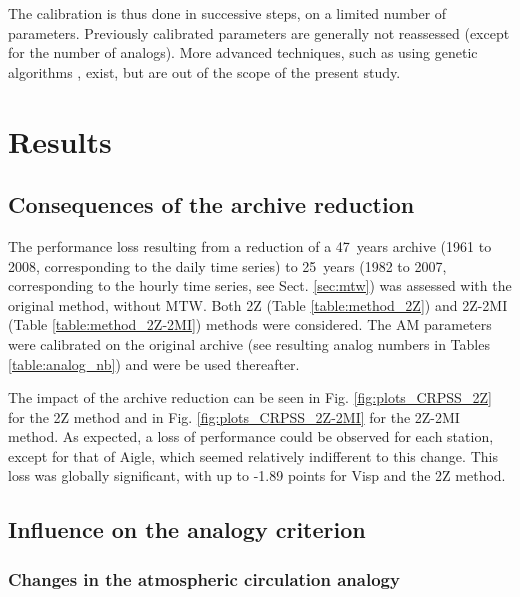 \documentclass[hess, manuscript]{copernicus}
\begin{document}
The calibration is thus done in successive steps, on a limited number of parameters. Previously calibrated parameters are generally not reassessed (except for the number of analogs). More advanced techniques, such as using genetic algorithms \citep{Horton2016}, exist, but are out of the scope of the present study.


\section{Results}
\label{sec:results}

\subsection{Consequences of the archive reduction}
\label{sec:archive_reduction}

The performance loss resulting from a reduction of a 47~years archive (1961 to 2008, corresponding to the daily time series) to 25~years (1982 to 2007, corresponding to the hourly time series, see Sect. \ref{sec:mtw}) was assessed with the original method, without MTW. Both 2Z (Table \ref{table:method_2Z}) and 2Z-2MI (Table \ref{table:method_2Z-2MI}) methods were considered. The AM parameters were calibrated on the original archive (see resulting analog numbers in Tables \ref{table:analog_nb}) and were be used thereafter.

The impact of the archive reduction can be seen in Fig. \ref{fig:plots_CRPSS_2Z} for the 2Z method and in Fig. \ref{fig:plots_CRPSS_2Z-2MI} for the 2Z-2MI method. As expected, a loss of performance could be observed for each station, except for that of Aigle, which seemed relatively indifferent to this change. This loss was globally significant, with up to -1.89 points for Visp and the 2Z method. 


\subsection{Influence on the analogy criterion}
\label{sec:influence_criteria}

\subsubsection{Changes in the atmospheric circulation analogy}
\end{document}
